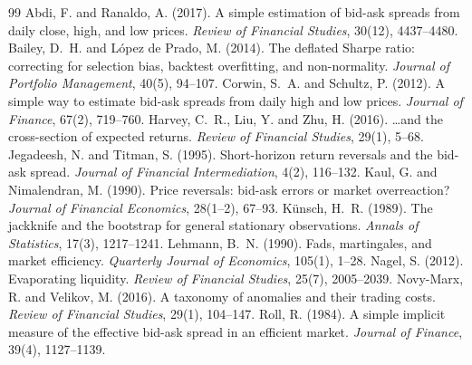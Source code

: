 \documentclass[11pt,a4paper]{article}
\begin{document}
\begin{thebibliography}{99}
 Abdi, F. and Ranaldo, A. (2017). A simple estimation of bid-ask spreads from daily close, high, and low prices. \emph{Review of Financial Studies}, 30(12), 4437--4480.
 Bailey, D.~H. and L\'opez de Prado, M. (2014). The deflated Sharpe ratio: correcting for selection bias, backtest overfitting, and non-normality. \emph{Journal of Portfolio Management}, 40(5), 94--107.
 Corwin, S.~A. and Schultz, P. (2012). A simple way to estimate bid-ask spreads from daily high and low prices. \emph{Journal of Finance}, 67(2), 719--760.
 Harvey, C.~R., Liu, Y. and Zhu, H. (2016). \ldots and the cross-section of expected returns. \emph{Review of Financial Studies}, 29(1), 5--68.
 Jegadeesh, N. and Titman, S. (1995). Short-horizon return reversals and the bid-ask spread. \emph{Journal of Financial Intermediation}, 4(2), 116--132.
 Kaul, G. and Nimalendran, M. (1990). Price reversals: bid-ask errors or market overreaction? \emph{Journal of Financial Economics}, 28(1--2), 67--93.
 K\"unsch, H.~R. (1989). The jackknife and the bootstrap for general stationary observations. \emph{Annals of Statistics}, 17(3), 1217--1241.
 Lehmann, B.~N. (1990). Fads, martingales, and market efficiency. \emph{Quarterly Journal of Economics}, 105(1), 1--28.
 Nagel, S. (2012). Evaporating liquidity. \emph{Review of Financial Studies}, 25(7), 2005--2039.
 Novy-Marx, R. and Velikov, M. (2016). A taxonomy of anomalies and their trading costs. \emph{Review of Financial Studies}, 29(1), 104--147.
 Roll, R. (1984). A simple implicit measure of the effective bid-ask spread in an efficient market. \emph{Journal of Finance}, 39(4), 1127--1139.
\end{thebibliography}
\end{document}
